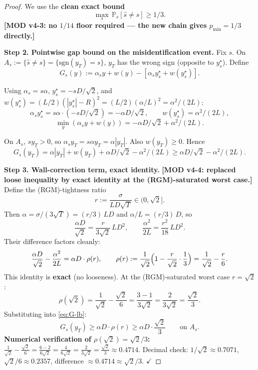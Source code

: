 \documentclass[11pt,a4paper]{article}
\theoremstyle{plain}
\theoremstyle{definition}
\theoremstyle{remark}
\newcommand{\Prb}{\mathbb{P}}
\begin{document}
\begin{proof}
We use the \textbf{clean exact bound}
\begin{equation}
\max_s\,\Prb_s[\hat s \neq s] \geq 1/3. \tag{MISS}\label{eq:MISS}
\end{equation}
\textbf{[MOD v4-3: no $1/14$ floor required --- the new chain gives $p_{\min} = 1/3$ directly.]}

\textbf{Step 2. Pointwise gap bound on the misidentification event.} Fix $s$. On $A_s := \{\hat s \neq s\} = \{\mathrm{sgn}(y_T) = s\}$, $y_T$ has the wrong sign (opposite to $y^\star_s$). Define
\[
G_s(y) := \alpha_s y + w(y) - [\alpha_s y^\star_s + w(y^\star_s)].
\]

Using $\alpha_s = s\alpha$, $y^\star_s = -sD/\sqrt 2$, and $w(y^\star_s) = (L/2)(|y^\star_s| - R)^2 = (L/2)(\alpha/L)^2 = \alpha^2/(2L)$:
\[
\alpha_s y^\star_s = s\alpha \cdot (-sD/\sqrt 2) = -\alpha D/\sqrt 2,\qquad w(y^\star_s) = \alpha^2/(2L),
\]
\[
\min_{y}(\alpha_s y + w(y)) = -\alpha D/\sqrt 2 + \alpha^2/(2L).
\]

On $A_s$, $sy_T > 0$, so $\alpha_s y_T = s\alpha y_T = \alpha |y_T|$. Also $w(y_T) \geq 0$. Hence
\begin{equation}
G_s(y_T) = \alpha|y_T| + w(y_T) + \alpha D/\sqrt 2 - \alpha^2/(2L) \geq \alpha D/\sqrt 2 - \alpha^2/(2L).\tag{G-lb}\label{eq:G-lb}
\end{equation}

\textbf{Step 3. Wall-correction term, exact identity.} \textbf{[MOD v4-4: replaced loose inequality by exact identity at the (RGM)-saturated worst case.]} Define the (RGM)-tightness ratio
\[
r := \frac{\sigma}{LD\sqrt T} \in (0, \sqrt 2].
\]
Then $\alpha = \sigma/(3\sqrt T) = (r/3)\, LD$ and $\alpha/L = (r/3)\, D$, so
\[
\frac{\alpha D}{\sqrt 2} = \frac{r}{3\sqrt 2}\, LD^2,\qquad \frac{\alpha^2}{2L} = \frac{r^2}{18}\, LD^2.
\]
Their difference factors cleanly:
\[
\frac{\alpha D}{\sqrt 2} - \frac{\alpha^2}{2L} = \alpha D \cdot \rho(r),\qquad \rho(r) := \frac{1}{\sqrt 2}\Bigl(1 - \frac{r}{\sqrt 2}\cdot \frac{1}{3}\Bigr) = \frac{1}{\sqrt 2} - \frac{r}{6}.
\]
This identity is \textbf{exact} (no looseness). At the (RGM)-saturated worst case $r = \sqrt 2$:
\[
\rho(\sqrt 2) = \frac{1}{\sqrt 2} - \frac{\sqrt 2}{6} = \frac{3 - 1}{3\sqrt 2} = \frac{2}{3\sqrt 2} = \frac{\sqrt 2}{3}.
\]
Substituting into \eqref{eq:G-lb}:
\begin{equation}
G_s(y_T) \geq \alpha D \cdot \rho(r) \geq \alpha D \cdot \frac{\sqrt 2}{3}\qquad \text{on } A_s. \tag{G-final}\label{eq:G-final}
\end{equation}
\textbf{Numerical verification of $\rho(\sqrt 2) = \sqrt 2/3$:} $\frac{1}{\sqrt 2} - \frac{\sqrt 2}{6} = \frac{6 - 2}{6\sqrt 2} = \frac{4}{6\sqrt 2} = \frac{2}{3\sqrt 2} = \frac{\sqrt 2}{3} \approx 0.4714$. Decimal check: $1/\sqrt 2 \approx 0.7071$, $\sqrt 2/6 \approx 0.2357$, difference $\approx 0.4714 \approx \sqrt 2/3$. $\checkmark$


\end{proof}
\end{document}

